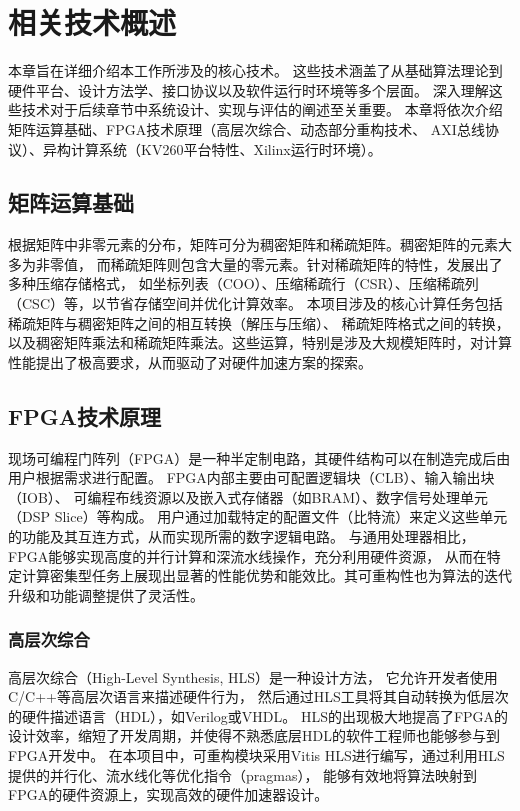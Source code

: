 \chapter{相关技术概述}

本章旨在详细介绍本工作所涉及的核心技术。
这些技术涵盖了从基础算法理论到硬件平台、设计方法学、接口协议以及软件运行时环境等多个层面。
深入理解这些技术对于后续章节中系统设计、实现与评估的阐述至关重要。
本章将依次介绍矩阵运算基础、FPGA技术原理（高层次综合、动态部分重构技术、
AXI总线协议）、异构计算系统（KV260平台特性、Xilinx运行时环境）。

\section{矩阵运算基础}

根据矩阵中非零元素的分布，矩阵可分为稠密矩阵和稀疏矩阵。稠密矩阵的元素大多为非零值，
而稀疏矩阵则包含大量的零元素。针对稀疏矩阵的特性，发展出了多种压缩存储格式，
如坐标列表（COO）、压缩稀疏行（CSR）、压缩稀疏列（CSC）等，以节省存储空间并优化计算效率。
本项目涉及的核心计算任务包括稀疏矩阵与稠密矩阵之间的相互转换（解压与压缩）、
稀疏矩阵格式之间的转换，以及稠密矩阵乘法和稀疏矩阵乘法。这些运算，特别是涉及大规模矩阵时，对计算性能提出了极高要求，从而驱动了对硬件加速方案的探索。

\section{FPGA技术原理}

现场可编程门阵列（FPGA）是一种半定制电路，其硬件结构可以在制造完成后由用户根据需求进行配置。
FPGA内部主要由可配置逻辑块（CLB）、输入输出块（IOB）、
可编程布线资源以及嵌入式存储器（如BRAM）、数字信号处理单元（DSP Slice）等构成。
用户通过加载特定的配置文件（比特流）来定义这些单元的功能及其互连方式，从而实现所需的数字逻辑电路。
与通用处理器相比，FPGA能够实现高度的并行计算和深流水线操作，充分利用硬件资源，
从而在特定计算密集型任务上展现出显著的性能优势和能效比。其可重构性也为算法的迭代升级和功能调整提供了灵活性。

\subsection{高层次综合}

高层次综合（High-Level Synthesis, HLS）是一种设计方法，
它允许开发者使用C/C++等高层次语言来描述硬件行为，
然后通过HLS工具将其自动转换为低层次的硬件描述语言（HDL），如Verilog或VHDL。
HLS的出现极大地提高了FPGA的设计效率，缩短了开发周期，并使得不熟悉底层HDL的软件工程师也能够参与到FPGA开发中。
在本项目中，可重构模块采用Vitis HLS进行编写，通过利用HLS提供的并行化、流水线化等优化指令（pragmas），
能够有效地将算法映射到FPGA的硬件资源上，实现高效的硬件加速器设计。

